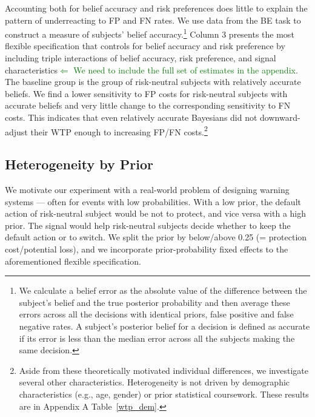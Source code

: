\documentclass[12pt,a4paper]{article}
\begin{document}
Accounting both for belief accuracy and risk preferences does little to explain the pattern of underreacting to FP and FN rates. We use data from the BE task to construct a measure of subjects' belief accuracy.\footnote{We calculate a belief error as the absolute value of the difference between the subject's belief and the true posterior probability and then average these errors across all the decisions with identical priors, false positive and false negative rates. A subject's posterior belief for a decision is defined as accurate if its error is less than the median error across all the subjects making the same decision.} Column 3 presents the most flexible specification that controls for belief accuracy and risk preference by including triple interactions of belief accuracy, risk preference, and signal characteristics\textcolor{green}{$\Leftarrow$ We need to include the full set of estimates in the appendix}. The baseline group is the group of risk-neutral subjects with relatively accurate beliefs. We find a lower sensitivity to FP costs for risk-neutral subjects with accurate beliefs and very little change to the corresponding sensitivity to FN costs. This indicates that even relatively accurate Bayesians did not downward-adjust their WTP enough to increasing FP/FN costs.\footnote{Aside from these theoretically motivated individual differences, we investigate several other characteristics.  Heterogeneity is not driven by demographic characteristics (e.g., age, gender) or prior statistical coursework.  These results are in Appendix A Table~\ref{wtp_dem}.}
  

\subsection{Heterogeneity by Prior}

We motivate our experiment with a real-world problem of designing warning systems --- often for events with low probabilities. With a low prior, the default action of risk-neutral subject would be not to protect, and vice versa with a high prior. The signal would help risk-neutral subjects decide whether to keep the default action or to switch. We split the prior by below/above 0.25 (= protection cost/potential loss), and we incorporate prior-probability fixed effects to the aforementioned flexible specification. 
\end{document}

